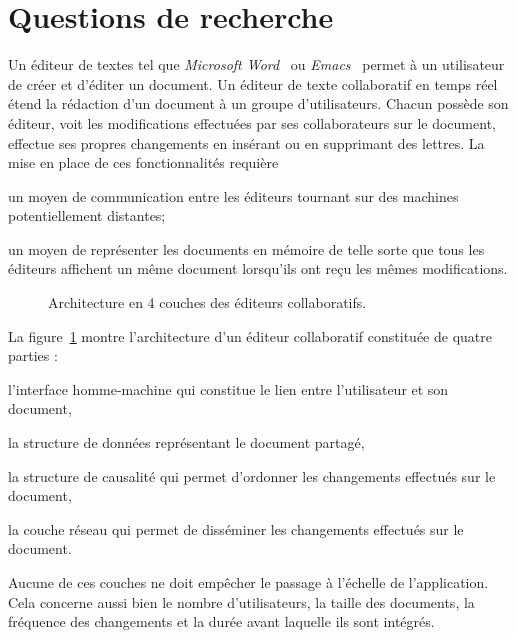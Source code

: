 
\section{Questions de recherche}

Un éditeur de textes tel que \emph{Microsoft Word}~\cite{word} ou
\emph{Emacs}~\cite{emacs} permet à un utilisateur de créer et d'éditer un
document. Un éditeur de texte collaboratif en temps
réel~\cite{ellis1991groupware} étend la rédaction d'un document à un groupe
d'utilisateurs. Chacun possède son éditeur, voit les modifications effectuées
par ses collaborateurs sur le document, effectue ses propres changements en
insérant ou en supprimant des lettres. La mise en place de ces fonctionnalités
requière
\begin{inparaenum}[(i)]
\item un moyen de communication entre les éditeurs tournant sur des machines
  potentiellement distantes;
\item un moyen de représenter les documents en mémoire de telle sorte que tous
  les éditeurs affichent un même document lorsqu'ils ont reçu les mêmes
  modifications.
\end{inparaenum}

\begin{figure}
  \begin{center}
    
    \caption[Architecture des éditeurs collaboratifs]
    {\label{intro:fig:architecture} Architecture en 4 couches des éditeurs
      collaboratifs.}
  \end{center}
\end{figure}

La figure~\ref{intro:fig:architecture} montre l'architecture d'un éditeur
collaboratif constituée de quatre parties :
\begin{inparaenum}[(i)]
\item l'interface homme-machine qui constitue le lien entre l'utilisateur et son
  document, 
\item la structure de données représentant le document partagé,
\item la structure de causalité qui permet d'ordonner les changements effectués
  sur le document,
\item la couche réseau qui permet de disséminer les changements effectués sur le
  document.
\end{inparaenum}
Aucune de ces couches ne doit empêcher le passage à l'échelle de l'application.
Cela concerne aussi bien le nombre d'utilisateurs, la taille des documents, la
fréquence des changements et la durée avant laquelle ils sont intégrés.

